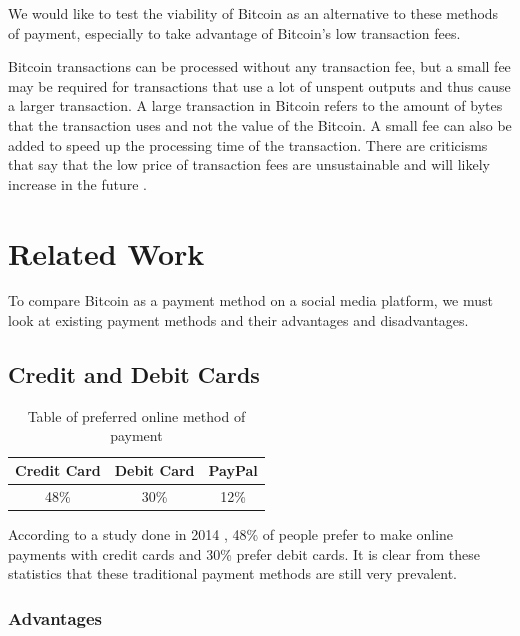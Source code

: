 We would like to test the viability of Bitcoin as an alternative to these methods of payment, especially to take advantage of Bitcoin's low transaction fees.

Bitcoin transactions can be processed without any transaction fee, but a small fee may be required for transactions that use a lot of unspent outputs and thus cause a larger transaction. A large transaction in Bitcoin refers to the amount of bytes that the transaction uses and not the value of the Bitcoin. A small fee can also be added to speed up the processing time of the transaction. There are criticisms that say that the low price of transaction fees are unsustainable and will likely increase in the future \cite{Ka2014}.



\section{Related Work}

To compare Bitcoin as a payment method on a social media platform, we must look at existing payment methods and their advantages and disadvantages. 

\subsection{Credit and Debit Cards}

\begin{table}
	\begin{center}
		\begin{tabular}	{ | c | c | c |}
		\hline
		Credit Card & Debit Card & PayPal \\ \hline
		48\% & 30\% & 12\% \\ \hline
	 
		\end{tabular}
		\caption{Table of preferred online method of payment \cite{tsys}} 
		\label{tbl:preferred_payment}
	\end{center}
\end{table}

According to a study done in 2014 \cite{tsys}, 48\% of people prefer to make online payments with credit cards and 30\% prefer debit cards. It is clear from these statistics that these traditional payment methods are still very prevalent. 

\subsubsection{Advantages}

